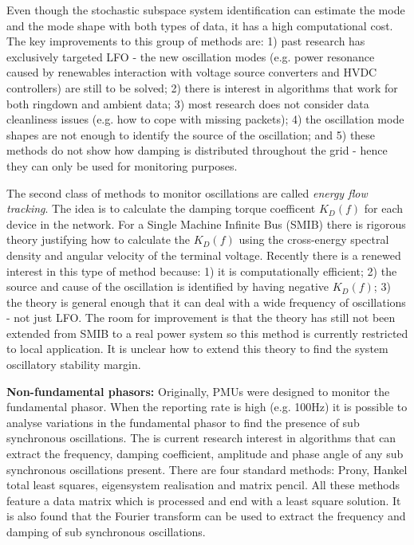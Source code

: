 \documentclass[12pt, a4paper]{report}
\begin{document}
Even though the stochastic subspace system identification can estimate the mode and the mode shape with both types of data, it has a high computational cost. The key improvements to this group of methods are: 1) past research has exclusively targeted LFO - the new oscillation modes (e.g. power resonance caused by renewables interaction with voltage source converters and  HVDC controllers) are still to be solved; 2) there is interest in algorithms that work for both ringdown and ambient data; 3) most research does not consider data cleanliness issues (e.g. how to cope with missing packets); 4) the oscillation mode shapes are not enough to identify the source of the oscillation; and 5) these methods do not show how damping is distributed throughout the grid - hence they can only be used for monitoring purposes.\par
The second class of methods to monitor oscillations are called \emph{energy flow tracking}. The idea is to calculate the damping torque coefficent $K_D(f)$ for each device in the network. For a Single Machine Infinite Bus (SMIB) there is rigorous theory justifying how to calculate the $K_D(f)$ using the cross-energy spectral density and angular velocity of the terminal voltage. Recently there is a renewed interest in this type of method because: 1) it is computationally efficient; 2) the source and cause of the oscillation is identified by having negative $K_D(f)$; 3) the theory is general enough that it can deal with a wide frequency of oscillations - not just LFO. The room for improvement is that the theory has still not been extended from SMIB to a real power system so this method is currently restricted to local application. It is unclear how to extend this theory to find the system oscillatory stability margin.\par
\textbf{Non-fundamental phasors:} Originally, PMUs were designed to monitor the fundamental phasor. When the reporting rate is high (e.g. 100Hz) it is possible to analyse variations in the fundamental phasor to find the presence of sub synchronous oscillations. The is current research interest in algorithms that can extract the frequency, damping coefficient, amplitude and phase angle of any sub synchronous oscillations present. There are four standard methods: Prony, Hankel total least squares, eigensystem realisation and matrix pencil. All these methods feature a data matrix which is processed and end with a least square solution. It is also found that the Fourier transform can be used to extract the frequency and damping of sub synchronous oscillations.\par
\end{document}
